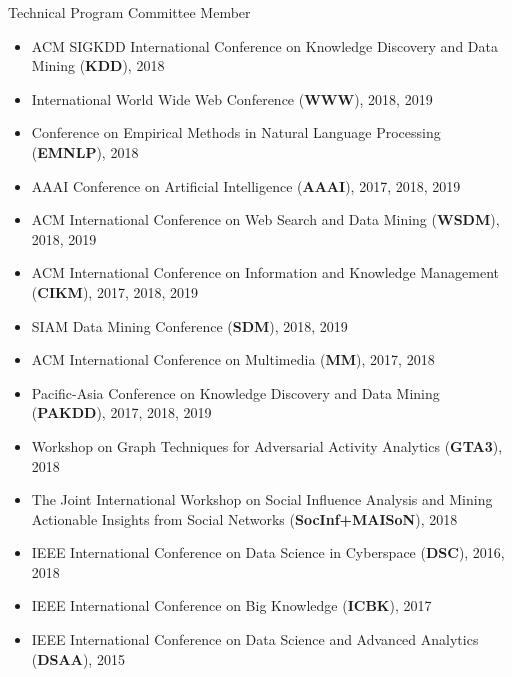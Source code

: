 \documentclass[margin, 9pt]{res}
\begin{document}
\begin{resume}
{Technical Program Committee Member}
\begin{itemize}
\item ACM SIGKDD International Conference on Knowledge Discovery and Data Mining (\textbf{KDD}), 2018
\item International World Wide Web Conference (\textbf{WWW}), 2018, 2019
\item Conference on Empirical Methods in Natural Language Processing (\textbf{EMNLP}), 2018
\item AAAI Conference on Artificial Intelligence (\textbf{AAAI}), 2017, 2018, 2019
\item ACM International Conference on Web Search and Data Mining (\textbf{WSDM}), 2018, 2019
\item ACM International Conference on Information and Knowledge Management (\textbf{CIKM}), 2017, 2018, 2019
\item SIAM Data Mining Conference (\textbf{SDM}), 2018, 2019
\item ACM International Conference on Multimedia (\textbf{MM}), 2017, 2018	
\item Pacific-Asia Conference on Knowledge Discovery and Data Mining (\textbf{PAKDD}), 2017, 2018, 2019
\item Workshop on Graph Techniques for Adversarial Activity Analytics (\textbf{GTA3}), 2018
\item The Joint International Workshop on Social Influence Analysis and Mining Actionable Insights from Social Networks (\textbf{SocInf+MAISoN}), 2018
\item IEEE International Conference on Data Science in Cyberspace (\textbf{DSC}), 2016, 2018
\item IEEE International Conference on Big Knowledge (\textbf{ICBK}), 2017
\item IEEE International Conference on Data Science and Advanced Analytics (\textbf{DSAA}), 2015
\end{itemize}
\vspace{-0.1in}


\end{resume}
\end{document}
